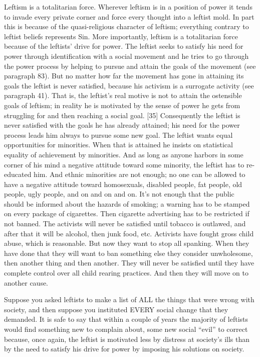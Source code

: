  Leftism is a totalitarian force. Wherever leftism is in a position of power it tends to invade every private corner and force every thought into a leftist mold. In part this is because of the quasi-religious character of leftism; everything contrary to leftist beliefs represents Sin. More importantly, leftism is a totalitarian force because of the leftists’ drive for power. The leftist seeks to satisfy his need for power through identification with a social movement and he tries to go through the power process by helping to pursue and attain the goals of the movement (see paragraph 83). But no matter how far the movement has gone in attaining its goals the leftist is never satisfied, because his activism is a surrogate activity (see paragraph 41). That is, the leftist’s real motive is not to attain the ostensible goals of leftism; in reality he is motivated by the sense of power he gets from struggling for and then reaching a social goal. [35] Consequently the leftist is never satisfied with the goals he has already attained; his need for the power process leads him always to pursue some new goal. The leftist wants equal opportunities for minorities. When that is attained he insists on statistical equality of achievement by minorities. And as long as anyone harbors in some corner of his mind a negative attitude toward some minority, the leftist has to re-educated him. And ethnic minorities are not enough; no one can be allowed to have a negative attitude toward homosexuals, disabled people, fat people, old people, ugly people, and on and on and on. It’s not enough that the public should be informed about the hazards of smoking; a warning has to be stamped on every package of cigarettes. Then cigarette advertising has to be restricted if not banned. The activists will never be satisfied until tobacco is outlawed, and after that it will be alcohol, then junk food, etc. Activists have fought gross child abuse, which is reasonable. But now they want to stop all spanking. When they have done that they will want to ban something else they consider unwholesome, then another thing and then another. They will never be satisfied until they have complete control over all child rearing practices. And then they will move on to another cause.

 Suppose you asked leftists to make a list of ALL the things that were wrong with society, and then suppose you instituted EVERY social change that they demanded. It is safe to say that within a couple of years the majority of leftists would find something new to complain about, some new social “evil” to correct because, once again, the leftist is motivated less by distress at society’s ills than by the need to satisfy his drive for power by imposing his solutions on society.


